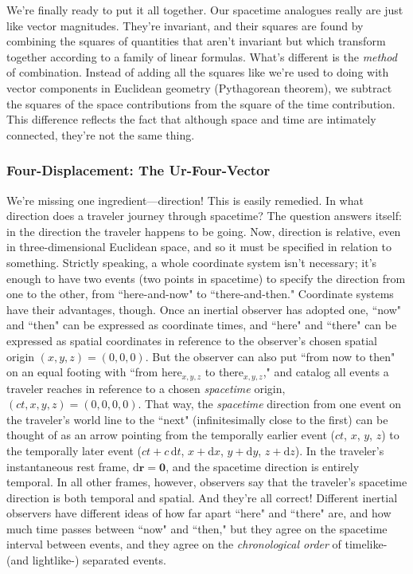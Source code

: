 \documentclass[12pt]{article}
\renewcommand{\vv}[1]{\mathbf{#1}}
\newcommand{\dd}[1]{\mathrm{d}#1}
\begin{document}
We're finally ready to put it all together. Our spacetime analogues really are just like vector magnitudes. They're invariant, and their squares are found by combining the squares of quantities that aren't invariant but which transform together according to a family of linear formulas. What's different is the \emph{method} of combination. Instead of adding all the squares like we're used to doing with vector components in Euclidean geometry (Pythagorean theorem), we subtract the squares of the space contributions from the square of the time contribution. This difference reflects the fact that although space and time are intimately connected, they're not the same thing.


\subsubsection{Four-Displacement: The Ur-Four-Vector}\label{sssec:fdi}

We're missing one ingredient---direction! This is easily remedied. In what direction does a traveler journey through spacetime? The question answers itself: in the direction the traveler happens to be going. Now, direction is relative, even in three-dimensional Euclidean space, and so it must be specified in relation to something. Strictly speaking, a whole coordinate system isn't necessary; it's enough to have two events (two points in spacetime) to specify the direction from one to the other, from ``here-and-now" to ``there-and-then." Coordinate systems have their advantages, though. Once an inertial observer has adopted one, ``now" and ``then" can be expressed as coordinate times, and ``here" and ``there" can be expressed as spatial coordinates in reference to the observer's chosen spatial origin $(x,y,z)=(0,0,0)$. But the observer can also put ``from now to then" on an equal footing with ``from here$_{x, y, z}$ to there$_{x, y, z}$," and catalog all events a traveler reaches in reference to a chosen \emph{spacetime} origin, $(ct,x,y,z)=(0,0,0,0)$. That way, the \emph{spacetime} direction from one event on the traveler's world line to the ``next" (infinitesimally close to the first) can be thought of as an arrow pointing from the temporally earlier event ($ct$, $x$, $y$, $z$) to the temporally later event ($ct + c \, \dd t$, $x + \dd x$, $y + \dd y$, $z + \dd z$). In the traveler's instantaneous rest frame, $\dd \vv r = \vv 0$, and the spacetime direction is entirely temporal. In all other frames, however, observers say that the traveler's spacetime direction is both temporal and spatial. And they're all correct! Different inertial observers have different ideas of how far apart ``here" and ``there" are, and how much time passes between ``now" and ``then," but they agree on the spacetime interval between events, and they agree on the \emph{chronological order} of timelike- (and lightlike-) separated events.
\end{document}
